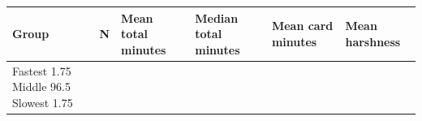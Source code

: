 \begin{tabular}{lrllll}
\toprule
Group & N & Mean total minutes & Median total minutes & Mean card minutes & Mean harshness\\
\midrule
Fastest 1.75%
Middle 96.5%
Slowest 1.75%
\bottomrule
\end{tabular}
